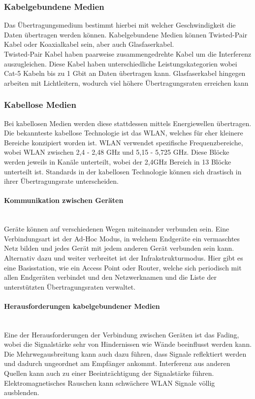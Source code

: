 \documentclass{article}
\newcommand{\paragraphlb}[1]{\paragraph{#1}\mbox{}\\}
\begin{document}
	 \subsubsection{Kabelgebundene Medien}
	 Das Übertragungsmedium bestimmt hierbei mit welcher Geschwindigkeit die Daten übertragen werden können. Kabelgebundene Medien können Twisted-Pair Kabel oder Koaxialkabel sein, aber auch Glasfaserkabel. \\
	 Twisted-Pair Kabel haben paarweise zusammengedrehte Kabel um die Interferenz auszugleichen. Diese Kabel haben unterschiedliche Leistungskategorien wobei Cat-5 Kabeln bis zu 1 Gbit an Daten übertragen kann. Glasfaserkabel hingegen arbeiten mit Lichtleitern, wodurch viel höhere Übertragungsraten erreichen kann \\
	 \subsubsection{Kabellose Medien}
	 Bei kabellosen Medien werden diese stattdessen mittels Energiewellen übertragen. Die bekannteste kabellose Technologie ist das WLAN, welches für eher kleinere Bereiche konzipiert worden ist. WLAN verwendet spezifische Frequenzbereiche, wobei WLAN zwischen 2,4 - 2,48 GHz und 5,15 - 5,725 GHz. Diese Blöcke werden jeweils in Kanäle unterteilt, wobei der 2,4GHz Bereich in 13 Blöcke unterteilt ist. Standards in der kabellosen Technologie können sich drastisch in ihrer Übertragungsrate unterscheiden. \\
	 \paragraphlb{Kommunikation zwischen Geräten}
	 Geräte können auf verschiedenen Wegen miteinander verbunden sein. Eine Verbindungsart ist der Ad-Hoc Modus, in welchem Endgeräte ein vermaschtes Netz bilden und jedes Gerät mit jedem anderen Gerät verbunden sein kann. Alternativ dazu und weiter verbreitet ist der Infrakstrukturmodus. Hier gibt es eine Basisstation, wie ein Access Point oder Router, welche sich periodisch mit allen Endgeräten verbindet und den Netzwerknamen und die Liste der unterstützten Übertragungsraten verwaltet.
	 \paragraphlb{Herausforderungen kabelgebundener Medien}
	 Eine der Herausforderungen der Verbindung zwischen Geräten ist das Fading, wobei die Signalstärke sehr von Hindernissen wie Wände beeinflusst werden kann. Die Mehrwegausbreitung kann auch dazu führen, dass Signale reflektiert werden und dadurch ungeordnet am Empfänger ankommt. Interferenz aus anderen Quellen kann auch zu einer Beeinträchtigung der Signalstärke führen. Elektromagnetisches Rauschen kann schwächere WLAN Signale völlig ausblenden. \\
\end{document}
